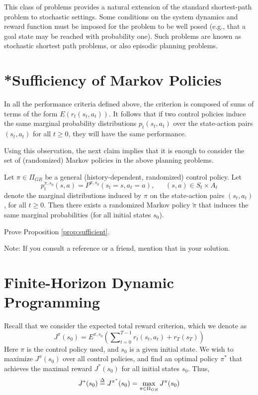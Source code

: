 This class of problems provides a natural extension of the standard shortest-path problem to stochastic settings.  Some conditions on the system dynamics and reward function must be imposed for the problem to be well posed (e.g., that a goal state may be reached  with probability one).
Such problems are known as stochastic shortest path problems, or also episodic planning problems.

\section{*Sufficiency of Markov Policies}
In all the performance criteria defined above, the criterion is composed of sums of terms of the form $E({r_t}({s_t},{a_t}))$. It follows that if two control policies induce the same marginal probability distributions ${p_t}({s_t},{a_t})$ over the state-action pairs $({s_t},{a_t})$ for all $t \ge 0$, they will have the same performance.

Using this observation, the next claim implies that it is enough to consider the set of (randomized) Markov policies in the above planning problems.

\begin{proposition}\label{prop:sufficient} Let  $\pi  \in {\Pi _{GR}}$ be a general (history-dependent, randomized) control policy.  Let
\[p_t^{\pi ,{s_0}}(s,a) = {P^{\pi ,{s_0}}}({s_t} = s,{a_t} = a),\quad \;\;(s,a) \in {S_t} \times {A_t}\]
denote the marginal distributions induced by $\pi$ on the state-action pairs $({s_t},{a_t})$, for all $t \ge 0$.
Then there exists a randomized Markov policy $\tilde \pi $ that induces the same marginal probabilities (for all initial states ${s_0}$).
\end{proposition}
\begin{exercise} Prove Proposition \ref{prop:sufficient}.

Note: If you consult a reference or a friend, mention that in your solution.
\end{exercise}


\section{Finite-Horizon Dynamic Programming}

Recall that we consider the expected total reward criterion, which we denote as
\[{J^\pi }({s_0}) = {E^{\pi ,{s_0}}}\left( {\sum\nolimits_{t = 0}^{T - 1} {{r_t}({s_t},{a_t}) + {r_T}({s_T})} } \right)\]
Here $\pi $ is the control policy used, and ${s_0}$ is a given initial state. We wish to maximize ${J^\pi }({s_0})$ over all control policies, and find an optimal policy ${\pi ^*}$ that achieves the maximal reward ${J^*}({s_0})$ for all initial states ${s_0}$.  Thus,
\[{J^*}({s_0}) \buildrel \Delta \over = {J^{\pi ^*}}({s_0}) = \mathop {\max }\limits_{\pi  \in {\Pi _{GR}}} {J^\pi }({s_0})\]


